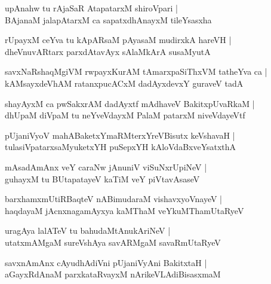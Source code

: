 \documentclass[twoside,12pt,openright]{book}
\newcounter{shloka}[chapter]
\begin{document}
\begin{shloka}%
upAnahw tu rAjaSaR AtapatarxM shiroVpari |\\
BAjanaM jalapAtarxM ca sapatxdhAnayxM tileYsasxha 
\end{shloka}

\begin{shloka}%
rUpayxM ceYva tu kApARsaM pAyasaM mudirxkA hareVH |\\
dheVnuvARtarx parxdAtavAyx sAlaMkArA susaMyutA
\end{shloka}

\begin{shloka}%
savxNaRshaqMgiVM rwpayxKurAM tAmarxpaSiThxVM tatheYva ca |\\
kAMsayxdeVhAM ratanxpucACxM dadAyxdevxY guraveV tadA 
\end{shloka}

\begin{shloka}%
shayAyxM ca pwSakxrAM dadAyxtf mAdhaveV BakitxpUvaRkaM |\\
dhUpaM diVpaM tu neYveVdayxM PalaM patarxM niveVdayeVtf
\end{shloka}

\begin{shloka}%
pUjaniVyoV mahABaketxYmaRMterxYreVBisutx keVshavaH |\\
tulasiVpatarxsaMyuketxYH puSepxYH kAloVdaBxveYsatxthA
\end{shloka}

\begin{shloka}%
mAsadAmAnx veY caraNw jAnuniV viSuNxrUpiNeV |\\
guhayxM tu BUtapatayeV kaTiM veY piVtavAsaseV 
\end{shloka}

\begin{shloka}%
barxhamxmUtiRBaqteV nABimudaraM vishavxyoVnayeV |\\
haqdayaM jAcnxnagamAyxya kaMThaM veYkuMThamUtaRyeV 
\end{shloka}

\begin{shloka}%
uragAya lalATeV tu bahudaMtAnukAriNeV |\\
utatxmAMgaM sureVshAya savARMgaM savaRmUtaRyeV 
\end{shloka}

\begin{shloka}%
savxnAmAnx cAyudhAdiVni pUjaniVyAni BakitxtaH |\\
aGayxRdAnaM parxkataRvayxM nArikeVLAdiBisasxmaM 
\end{shloka}
\end{document}
